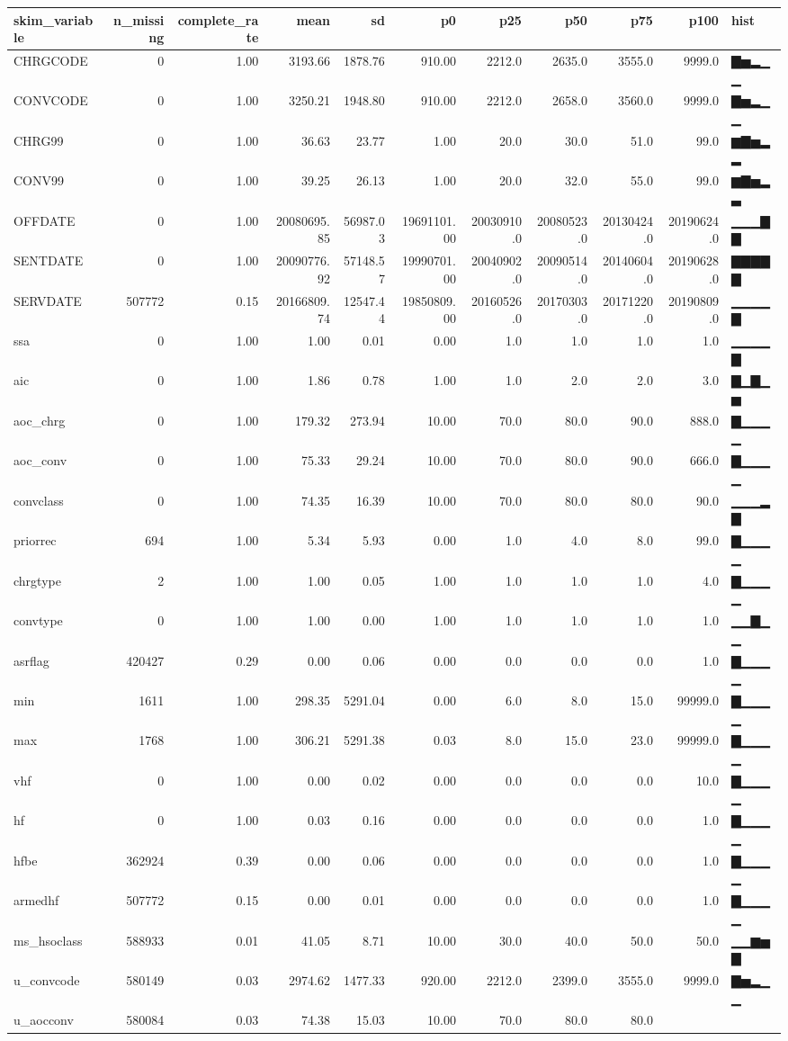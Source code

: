 \documentclass[
]{article}
\begin{document}
\begin{longtable}[]{@{}lrrrrrrrrrl@{}}
\toprule
skim\_variable & n\_missing & complete\_rate & mean & sd & p0 & p25 &
p50 & p75 & p100 & hist\tabularnewline
\midrule
\endhead
CHRGCODE & 0 & 1.00 & 3193.66 & 1878.76 & 910.00 & 2212.0 & 2635.0 &
3555.0 & 9999.0 & ▇▅▂▁▁\tabularnewline
CONVCODE & 0 & 1.00 & 3250.21 & 1948.80 & 910.00 & 2212.0 & 2658.0 &
3560.0 & 9999.0 & ▇▅▂▁▁\tabularnewline
CHRG99 & 0 & 1.00 & 36.63 & 23.77 & 1.00 & 20.0 & 30.0 & 51.0 & 99.0 &
▆▇▅▂▂\tabularnewline
CONV99 & 0 & 1.00 & 39.25 & 26.13 & 1.00 & 20.0 & 32.0 & 55.0 & 99.0 &
▆▇▅▂▃\tabularnewline
OFFDATE & 0 & 1.00 & 20080695.85 & 56987.03 & 19691101.00 & 20030910.0 &
20080523.0 & 20130424.0 & 20190624.0 & ▁▁▁▇▇\tabularnewline
SENTDATE & 0 & 1.00 & 20090776.92 & 57148.57 & 19990701.00 & 20040902.0
& 20090514.0 & 20140604.0 & 20190628.0 & ▇▇▇▇▇\tabularnewline
SERVDATE & 507772 & 0.15 & 20166809.74 & 12547.44 & 19850809.00 &
20160526.0 & 20170303.0 & 20171220.0 & 20190809.0 & ▁▁▁▁▇\tabularnewline
ssa & 0 & 1.00 & 1.00 & 0.01 & 0.00 & 1.0 & 1.0 & 1.0 & 1.0 &
▁▁▁▁▇\tabularnewline
aic & 0 & 1.00 & 1.86 & 0.78 & 1.00 & 1.0 & 2.0 & 2.0 & 3.0 &
▇▁▇▁▅\tabularnewline
aoc\_chrg & 0 & 1.00 & 179.32 & 273.94 & 10.00 & 70.0 & 80.0 & 90.0 &
888.0 & ▇▁▁▁▁\tabularnewline
aoc\_conv & 0 & 1.00 & 75.33 & 29.24 & 10.00 & 70.0 & 80.0 & 90.0 &
666.0 & ▇▁▁▁▁\tabularnewline
convclass & 0 & 1.00 & 74.35 & 16.39 & 10.00 & 70.0 & 80.0 & 80.0 & 90.0
& ▁▁▁▂▇\tabularnewline
priorrec & 694 & 1.00 & 5.34 & 5.93 & 0.00 & 1.0 & 4.0 & 8.0 & 99.0 &
▇▁▁▁▁\tabularnewline
chrgtype & 2 & 1.00 & 1.00 & 0.05 & 1.00 & 1.0 & 1.0 & 1.0 & 4.0 &
▇▁▁▁▁\tabularnewline
convtype & 0 & 1.00 & 1.00 & 0.00 & 1.00 & 1.0 & 1.0 & 1.0 & 1.0 &
▁▁▇▁▁\tabularnewline
asrflag & 420427 & 0.29 & 0.00 & 0.06 & 0.00 & 0.0 & 0.0 & 0.0 & 1.0 &
▇▁▁▁▁\tabularnewline
min & 1611 & 1.00 & 298.35 & 5291.04 & 0.00 & 6.0 & 8.0 & 15.0 & 99999.0
& ▇▁▁▁▁\tabularnewline
max & 1768 & 1.00 & 306.21 & 5291.38 & 0.03 & 8.0 & 15.0 & 23.0 &
99999.0 & ▇▁▁▁▁\tabularnewline
vhf & 0 & 1.00 & 0.00 & 0.02 & 0.00 & 0.0 & 0.0 & 0.0 & 10.0 &
▇▁▁▁▁\tabularnewline
hf & 0 & 1.00 & 0.03 & 0.16 & 0.00 & 0.0 & 0.0 & 0.0 & 1.0 &
▇▁▁▁▁\tabularnewline
hfbe & 362924 & 0.39 & 0.00 & 0.06 & 0.00 & 0.0 & 0.0 & 0.0 & 1.0 &
▇▁▁▁▁\tabularnewline
armedhf & 507772 & 0.15 & 0.00 & 0.01 & 0.00 & 0.0 & 0.0 & 0.0 & 1.0 &
▇▁▁▁▁\tabularnewline
ms\_hsoclass & 588933 & 0.01 & 41.05 & 8.71 & 10.00 & 30.0 & 40.0 & 50.0
& 50.0 & ▁▁▆▅▇\tabularnewline
u\_convcode & 580149 & 0.03 & 2974.62 & 1477.33 & 920.00 & 2212.0 &
2399.0 & 3555.0 & 9999.0 & ▇▅▂▁▁\tabularnewline
u\_aocconv & 580084 & 0.03 & 74.38 & 15.03 & 10.00 & 70.0 & 80.0 & 80.0

\end{longtable}
\end{document}
